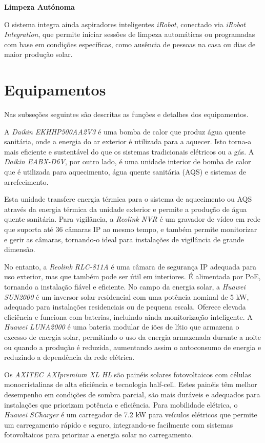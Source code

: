 \vspace{1em}
\textbf{Limpeza Autónoma}

O sistema integra ainda aspiradores inteligentes \textit{iRobot}, conectado via \textit{iRobot Integration}, que permite iniciar sessões de limpeza automáticas ou programadas com base em condições específicas, como ausência de pessoas na casa ou dias de maior produção solar.




\section{Equipamentos}

Nas subseções seguintes são descritas as funções e detalhes dos equipamentos.\

A \textit{Daikin EKHHP500AA2V3} é uma bomba de calor que produz água quente sanitária, onde a energia do ar exterior é utilizada para a aquecer. Isto torna-a mais eficiente e sustentável do que os sistemas tradicionais elétricos ou a gás. A \textit{Daikin EABX-D6V}, por outro lado, é uma unidade interior de bomba de calor que é utilizada para aquecimento, água quente sanitária (AQS) e sistemas de arrefecimento.

Esta unidade transfere energia térmica para o sistema de aquecimento ou AQS através da energia térmica da unidade exterior e permite a produção de água quente sanitária. Para vigilância, a \textit{Reolink NVR} é um gravador de vídeo em rede que suporta até 36 câmaras IP ao mesmo tempo, e também permite monitorizar e gerir as câmaras, tornando-o ideal para instalações de vigilância de grande dimensão.

No entanto, a \textit{Reolink RLC-811A} é uma câmara de segurança IP adequada para uso exterior, mas que também pode ser útil em interiores. É alimentada por PoE, tornando a instalação fiável e eficiente. No campo da energia solar, a \textit{Huawei SUN2000} é um inversor solar residencial com uma potência nominal de 5 kW, adequado para instalações residenciais ou de pequena escala. Oferece elevada eficiência e funciona com baterias, incluindo ainda monitorização inteligente. A \textit{Huawei LUNA2000} é uma bateria modular de iões de lítio que armazena o excesso de energia solar, permitindo o uso da energia armazenada durante a noite ou quando a produção é reduzida, aumentando assim o autoconsumo de energia e reduzindo a dependência da rede elétrica.

Os \textit{AXITEC AXIpremium XL HL} são painéis solares fotovoltaicos com células monocristalinas de alta eficiência e tecnologia half-cell. Estes painéis têm melhor desempenho em condições de sombra parcial, são mais duráveis e adequados para instalações que priorizam potência e eficiência. Para mobilidade elétrica, o \textit{Huawei SCharger} é um carregador de 7.2 kW para veículos elétricos que permite um carregamento rápido e seguro, integrando-se facilmente com sistemas fotovoltaicos para priorizar a energia solar no carregamento.

